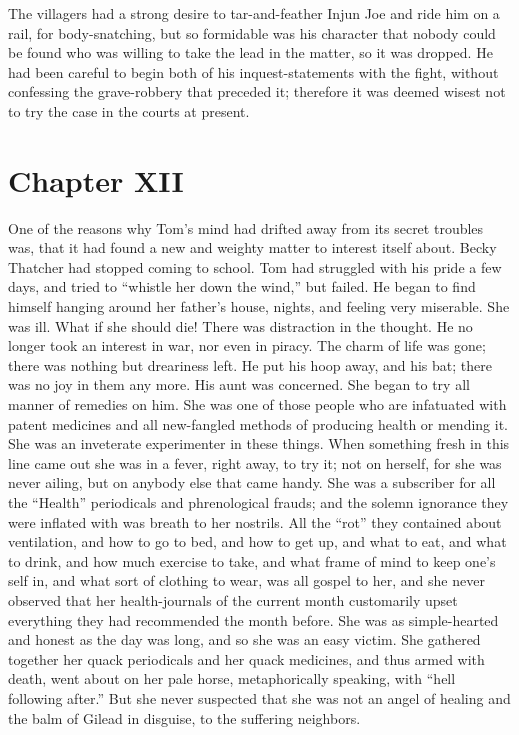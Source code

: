 \documentclass{book}
\begin{document}
The villagers had a strong desire to tar-and-feather Injun Joe and ride him on a rail, for body-snatching, but so formidable was his character that nobody could be found who was willing to take the lead in the matter, so it was dropped. He had been careful to begin both of his inquest-statements with the fight, without confessing the grave-robbery that preceded it; therefore it was deemed wisest not to try the case in the courts at present.

\chapter*{Chapter XII}

One of the reasons why Tom’s mind had drifted away from its secret troubles was, that it had found a new and weighty matter to interest itself about. Becky Thatcher had stopped coming to school. Tom had struggled with his pride a few days, and tried to “whistle her down the wind,” but failed. He began to find himself hanging around her father’s house, nights, and feeling very miserable. She was ill. What if she should die! There was distraction in the thought. He no longer took an interest in war, nor even in piracy. The charm of life was gone; there was nothing but dreariness left. He put his hoop away, and his bat; there was no joy in them any more. His aunt was concerned. She began to try all manner of remedies on him. She was one of those people who are infatuated with patent medicines and all new-fangled methods of producing health or mending it. She was an inveterate experimenter in these things. When something fresh in this line came out she was in a fever, right away, to try it; not on herself, for she was never ailing, but on anybody else that came handy. She was a subscriber for all the “Health” periodicals and phrenological frauds; and the solemn ignorance they were inflated with was breath to her nostrils. All the “rot” they contained about ventilation, and how to go to bed, and how to get up, and what to eat, and what to drink, and how much exercise to take, and what frame of mind to keep one’s self in, and what sort of clothing to wear, was all gospel to her, and she never observed that her health-journals of the current month customarily upset everything they had recommended the month before. She was as simple-hearted and honest as the day was long, and so she was an easy victim. She gathered together her quack periodicals and her quack medicines, and thus armed with death, went about on her pale horse, metaphorically speaking, with “hell following after.” But she never suspected that she was not an angel of healing and the balm of Gilead in disguise, to the suffering neighbors.
\end{document}
